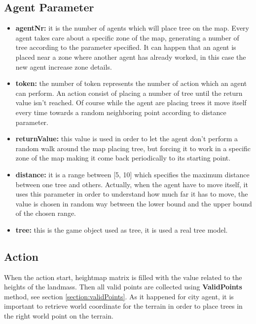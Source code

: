 \documentclass[12pt]{article}
\begin{document}
    \subsection{Agent Parameter}

    \begin{itemize}
        \item \textbf{agentNr:} it is the number of agents which will place tree on the map. Every agent takes care about a specific zone of the map, generating a number of tree
        according to the parameter specified. It can happen that an agent is placed near a zone where another agent has already worked, in this case the new agent increase
        zone details.
        \item \textbf{token:} the number of token represents the number of action which an agent can perform. An action consist of placing a number of tree until the return value
        isn't reached. Of course while the agent are placing trees it move itself every time towards a random neighboring point according to distance parameter.
        \item \textbf{returnValue:} this value is used in order to let the agent don't perform a random walk around the map placing tree, but forcing it to work in a specific zone of 
        the map making it come back periodically to its starting point.
        \item \textbf{distance:} it is a range between [5, 10] which specifies the maximum distance between one tree and others. Actually, when the agent have to move itself, it uses this
        parameter in order to understand how much far it has to move, the value is chosen in random way between the lower bound and the upper bound of the chosen range.
        \item \textbf{tree:} this is the game object used as tree, it is used a real tree model.
    \end{itemize}

    \subsection{Action}
    When the action start, heightmap matrix is filled with the value related to the heights of the landmass. Then all valid points are collected using \textbf{ValidPoints} method, see
    section \ref{section:validPoints}. As it happened for city agent, it is important to retrieve world coordinate for the terrain in order to place trees in the right world point on the terrain.
\end{document}

